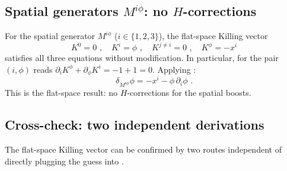 \documentclass[11pt]{article}
\begin{document}
\subsection{\texorpdfstring{Spatial generators $M^{i\phi}$: no $H$-corrections}{Spatial generators M\^{}iphi: no H-corrections}}
\label{subsec:spatial-boost}

For the spatial generator $M^{i\phi}$ ($i \in \{1,2,3\}$), the flat-space Killing vector
\begin{equation}
\label{eq:spatial-killing}
K^0 = 0 \,\,, \quad K^i = \phi \,\,, \quad K^{j \neq i} = 0 \,\,, \quad K^\phi = -x^i
\end{equation}
satisfies all three equations  without modification.  In particular,
 for the pair $(i, \phi)$ reads $\partial_i K^\phi + \partial_\phi K^i = -1 + 1 = 0$.
Applying :
\begin{equation}
\label{eq:delta-phi-spatial}
\delta_{M^{i\phi}}\phi = -x^i - \phi\,\partial_i\phi \,\,.
\end{equation}
This is the flat-space result: no $H$-corrections for the spatial boosts.

\subsection{Cross-check: two independent derivations}
\label{subsec:spatial-crosscheck}

The flat-space Killing vector  can be confirmed by two routes
independent of directly plugging the guess into .
\end{document}
